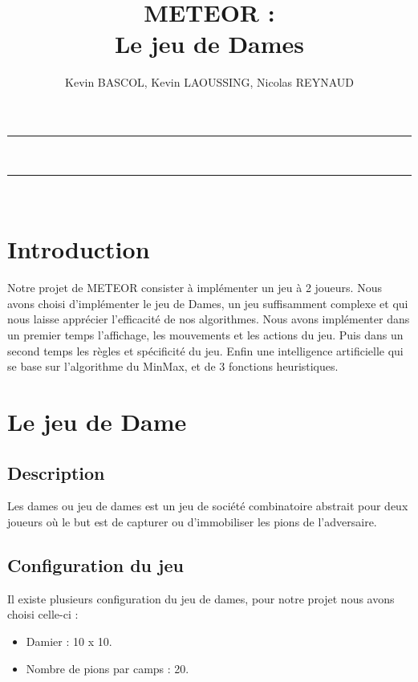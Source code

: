 \documentclass[10pt,a4paper]{report}
\author{Kevin BASCOL, Kevin LAOUSSING, Nicolas REYNAUD}
\title{METEOR : \\ \vspace*{0.5cm} Le jeu de Dames}
\begin{document}
\makeatletter
	\begin{titlepage}
	
	\centering
		{
		\vspace*{5cm}
		\hrule height 2pt
		\vspace{0.7cm}
		\Huge \textbf{\@title}}\\
		\vspace{0.7cm}
		\hrule height 2pt
		
		\vfill
		\vspace{1cm}
		\@author\\
		\end{titlepage}
\makeatother
\setcounter{secnumdepth}{4}
\setcounter{tocdepth}{3}
\renewcommand{\contentsname}{Sommaire}
\begingroup\makeatletter
\def\@makeschapterhead#1{%
  {\parindent \z@ \raggedright
    \normalfont
    \interlinepenalty\@M
    \Huge \bfseries  #1\par\nobreak
    \vskip 20pt%
  }}\makeatother
\tableofcontents
\endgroup
\thispagestyle{empty}
\setcounter{page}{0}
\newpage


\section{Introduction}
	Notre projet de METEOR consister à implémenter un jeu à 2 joueurs. Nous avons choisi d'implémenter le jeu de Dames, un jeu suffisamment complexe et qui nous laisse apprécier l'efficacité de nos algorithmes.
Nous avons implémenter dans un premier temps l'affichage, les mouvements et les actions du jeu. Puis dans un second temps les règles et spécificité du jeu. Enfin une intelligence artificielle qui se base sur l'algorithme du MinMax, et de 3 fonctions heuristiques.
\section{Le jeu de Dame}
	\subsection{Description}
	Les dames ou jeu de dames est un jeu de société combinatoire abstrait pour deux joueurs où le but est de capturer ou d'immobiliser les pions de l'adversaire.
	\subsection{Configuration du jeu}
	Il existe plusieurs configuration du jeu de dames, pour notre projet nous avons choisi celle-ci :
	\begin{itemize}[label = $\blacktriangleright$]
		\item Damier :  10 x 10.
		\item Nombre de pions par camps : 20.
	\end{itemize}
	
\end{document}
